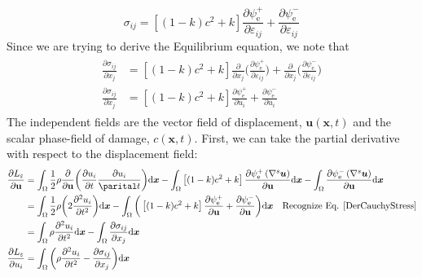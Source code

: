 \documentclass[12pt,3p]{article}
\numberwithin{equation}{section}
\begin{document}
\begin{equation}\label{CauchyStress}
\sigma_{i j}=\left[(1-k) c^{2}+k\right] \frac{\partial \psi_{\mathrm{e}}^{+}}{\partial \varepsilon_{i j}}+\frac{\partial \psi_{\mathrm{e}}^{-}}{\partial \varepsilon_{i j}}
\end{equation}
Since we are trying to derive the Equilibrium equation, we note that 
\begin{align}\label{DerCauchyStress}
\begin{split}
\frac{\partial \sigma_{i j}}{\partial x_j} &= 
\left[(1-k) c^{2}+k\right] \frac{\partial}{\partial x_j} \bigg( \frac{\partial \psi_{\mathrm{e}}^{+}}{\partial \varepsilon_{i j}} \bigg) + \frac{\partial}{\partial x_j} \bigg( \frac{\partial \psi_{\mathrm{e}}^{-}}{\partial \varepsilon_{i j}} \bigg) \\
\frac{\partial \sigma_{i j}}{\partial x_j} &= 
\left[(1-k) c^{2}+k\right] \frac{\partial \psi_{\mathrm{e}}^{+}}{\partial u_i} + \frac{\partial \psi_{\mathrm{e}}^{-}}{\partial u_i}
\end{split}
\end{align}
The independent fields are the vector field of displacement, $\mathbf{u} (\mathbf{x}, t)$ and the scalar phase-field of damage, $c (\mathbf{x}, t)$. First, we can take the partial derivative with respect to the displacement field:
\begin{align*}
\frac{\partial L_{\varepsilon}}{\partial \mathbf{u}} &= 
\int_{\Omega} \frac{1}{2} \rho \frac{\partial}{\partial \mathbf{u}} \bigg( \frac{\partial u_i}{\partial t} \frac{\partial u_i}{\parital t} \bigg) \mathrm{d} \boldsymbol{x} 
- \int_{\Omega} \left[(1-k) c^{2} + k \right] \frac{\partial \psi_{\mathrm{e}}^{+} \left(\nabla^{s} \boldsymbol{u} \right)}{\partial \mathbf{u}} \mathrm{d} \boldsymbol{x} 
- \int_{\Omega} \frac{\partial \psi_{\mathrm{e}}^{-} \left(\nabla^{s} \boldsymbol{u}\right)}{\partial \mathbf{u}} \mathrm{d} \boldsymbol{x} \\
&= \int_{\Omega} \frac{1}{2} \rho \bigg( 2 \frac{\partial^2 u_i}{\partial t^2} \bigg)  \mathrm{d} \boldsymbol{x} 
- \int_{\Omega} \bigg( \left[(1-k) c^{2} + k \right] \frac{\partial \psi_{\mathrm{e}}^{+} }{\partial \mathbf{u}} + \frac{\partial \psi_{\mathrm{e}}^{-}}{\partial \mathbf{u}} \bigg) \mathrm{d} \boldsymbol{x}  \quad \text{Recognize Eq. \ref{DerCauchyStress}} \\
&= \int_{\Omega} \rho \frac{\partial^2 u_i}{\partial t^2} \mathrm{d} \boldsymbol{x} 
- \int_{\Omega} \frac{\partial \sigma_{i j}}{\partial x_j} \mathrm{d} \boldsymbol{x} \\
\frac{\partial L_{\varepsilon}}{\partial u_i} &= \int_{\Omega} \bigg( \rho \frac{\partial^2 u_i}{\partial t^2} - \frac{\partial \sigma_{i j}}{\partial x_j} \bigg) \mathrm{d} \boldsymbol{x}
\end{align*}
\end{document}

